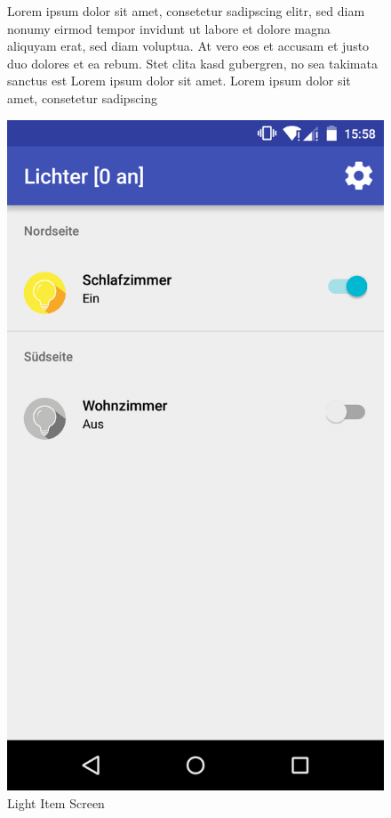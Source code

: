 \begin{figure}[htbp]
	\begin{minipage}{0.6\textwidth} 
Lorem ipsum dolor sit amet, consetetur sadipscing elitr, sed diam nonumy eirmod tempor invidunt ut labore et dolore magna aliquyam erat, sed diam voluptua. At vero eos et accusam et justo duo dolores et ea rebum. Stet clita kasd gubergren, no sea takimata sanctus est Lorem ipsum dolor sit amet. Lorem ipsum dolor sit amet, consetetur sadipscing 
	\end{minipage}
	\hfill
	\begin{minipage}{0.32\textwidth}
		\includegraphics[scale=0.12]{appendix/img/AppScreenshots/Screenshot4}
		\caption{Light Item Screen}
		\label{fig:screenshot_4}
	\end{minipage}
\end{figure}

